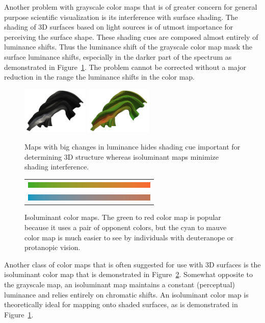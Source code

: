 \documentclass[twocolumn]{article}
\begin{document}
Another problem with grayscale color maps that is of greater concern for
general purpose scientific visualization is its interference with surface
shading.  The shading of 3D surfaces based on light sources is of utmost
importance for perceiving the surface shape.  These shading cues are
composed almost entirely of luminance shifts.  Thus the luminance shift of
the grayscale color map mask the surface luminance shifts, especially in
the darker part of the spectrum as demonstrated in
Figure~\ref{fig:LuminanceVsShading}.  The problem cannot be corrected
without a major reduction in the range the luminance shifts in the color
map.

\begin{figure}
  \centering
  \includegraphics[width=1.25in]{images/GrayscaleShading}
  \includegraphics[width=1.25in]{images/IsoluminantShading}
  \caption{Maps with big changes in luminance hides shading cue important
    for determining 3D structure whereas isoluminant maps minimize shading
    interference.}
  \label{fig:LuminanceVsShading}
\end{figure}

\begin{figure}
  \centering
  \begin{tabular}{c}
    \includegraphics[width=2.5in]{images/Green2RedBar} \\
    \includegraphics[width=2.5in]{images/Cyan2MauveBar}
  \end{tabular}
  \caption{Isoluminant color maps.  The green to red color map is popular
    because it uses a pair of opponent colors, but the cyan to mauve color
    map is much easier to see by individuals with deuteranope or protanopic
    vision.}
  \label{fig:IsoluminantColorMap}
\end{figure}
Another class of color maps that is often suggested for use with 3D
surfaces is the isoluminant color map that is demonstrated in
Figure~\ref{fig:IsoluminantColorMap}.  Somewhat opposite to the grayscale
map, an isoluminant map maintains a constant (perceptual) luminance and
relies entirely on chromatic shifts.  An isoluminant color map is
theoretically ideal for mapping onto shaded surfaces, as is demonstrated in
Figure~\ref{fig:LuminanceVsShading}.
\end{document}
